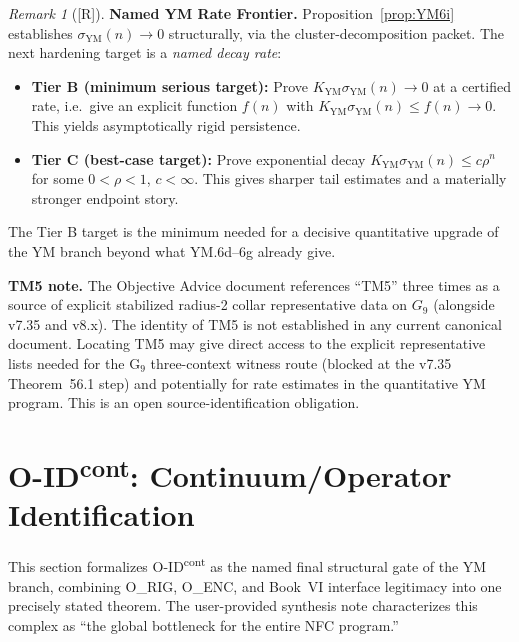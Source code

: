 \documentclass[12pt,oneside]{amsbook}
\theoremstyle{plain}
\theoremstyle{definition}
\theoremstyle{remark}
\newtheorem{remark}[theorem]{Remark}
\newcommand{\status}[1]{\textup{[#1]}}
\begin{document}
\begin{remark}[\status{R}]
\textbf{Named YM Rate Frontier.}
Proposition~\ref{prop:YM6i} establishes $\sigma_{\mathrm{YM}}(n)
\to 0$ structurally, via the cluster-decomposition packet. The
next hardening target is a \emph{named decay rate}:
\begin{itemize}
 \item \textbf{Tier B (minimum serious target):} Prove
 $K_{\mathrm{YM}}\sigma_{\mathrm{YM}}(n) \to 0$ at a certified
 rate, i.e.\ give an explicit function $f(n)$ with
 $K_{\mathrm{YM}}\sigma_{\mathrm{YM}}(n) \leq f(n) \to 0$.
 This yields asymptotically rigid persistence.
 \item \textbf{Tier C (best-case target):} Prove exponential decay
 $K_{\mathrm{YM}}\sigma_{\mathrm{YM}}(n) \leq c\rho^n$ for
 some $0 < \rho < 1$, $c < \infty$. This gives sharper tail
 estimates and a materially stronger endpoint story.
\end{itemize}
The Tier B target is the minimum needed for a decisive quantitative
upgrade of the YM branch beyond what YM.6d--6g already give.

\textbf{TM5 note.} The Objective Advice document references
``TM5'' three times as a source of explicit stabilized radius-2
collar representative data on $G_9$ (alongside v7.35 and v8.x).
The identity of TM5 is not established in any current canonical
document. Locating TM5 may give direct access to the explicit
representative lists needed for the G$_9$ three-context witness
route (blocked at the v7.35 Theorem~56.1 step) and potentially for
rate estimates in the quantitative YM program. This is an open
source-identification obligation.
\end{remark}

\section{O-ID\textsuperscript{cont}: Continuum/Operator Identification}
\label{sec:O-ID-cont}

This section formalizes O-ID\textsuperscript{cont} as the named
final structural gate of the YM branch, combining O\_RIG, O\_ENC,
and Book~VI interface legitimacy into one precisely stated theorem.
The user-provided synthesis note characterizes this complex as
``the global bottleneck for the entire NFC program.''
\end{document}
